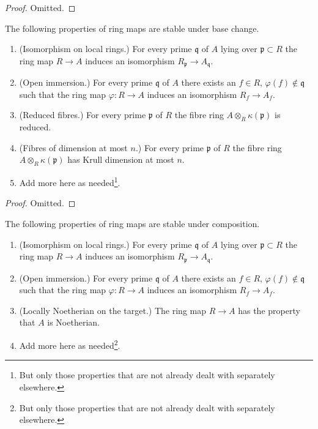 \begin{proof}
Omitted.
\end{proof}

\begin{lemma}
\label{lemma-properties-base-change}
The following properties of ring maps are stable under base change.
\begin{enumerate}
\item (Isomorphism on local rings.)
For every prime $\mathfrak q$ of $A$ lying over $\mathfrak p \subset R$
the ring map $R \to A$ induces an isomorphism
$R_{\mathfrak p} \to A_{\mathfrak q}$.
\item (Open immersion.)
For every prime $\mathfrak q$ of $A$ there exists an $f \in R$,
$\varphi(f) \not \in \mathfrak q$ such that the ring map $\varphi : R \to A$
induces an isomorphism $R_f \to A_f$.
\item (Reduced fibres.)
For every prime $\mathfrak p$ of $R$ the fibre ring
$A \otimes_R \kappa(\mathfrak p)$ is reduced.
\item (Fibres of dimension at most $n$.)
For every prime $\mathfrak p$ of $R$ the fibre ring
$A \otimes_R \kappa(\mathfrak p)$ has Krull dimension at most $n$.
\item Add more here as needed\footnote{But only those properties
that are not already dealt with separately elsewhere.}.
\end{enumerate}
\end{lemma}

\begin{proof}
Omitted.
\end{proof}

\begin{lemma}
\label{lemma-properties-composition}
The following properties of ring maps are stable under composition.
\begin{enumerate}
\item (Isomorphism on local rings.)
For every prime $\mathfrak q$ of $A$ lying over $\mathfrak p \subset R$
the ring map $R \to A$ induces an isomorphism
$R_{\mathfrak p} \to A_{\mathfrak q}$.
\item (Open immersion.)
For every prime $\mathfrak q$ of $A$ there exists an $f \in R$,
$\varphi(f) \not \in \mathfrak q$ such that the ring map $\varphi : R \to A$
induces an isomorphism $R_f \to A_f$.
\item (Locally Noetherian on the target.)
The ring map $R \to A$ has the property that $A$ is Noetherian.
\item Add more here as needed\footnote{But only those properties
that are not already dealt with separately elsewhere.}.
\end{enumerate}
\end{lemma}


